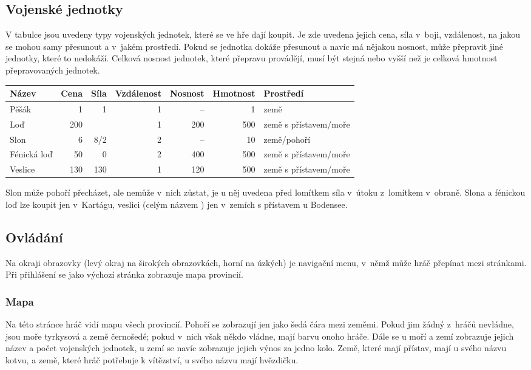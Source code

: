 \documentclass[a4paper,12pt]{article}
\begin{document}
\subsection{Vojenské jednotky}
V tabulce jsou uvedeny typy vojenských jednotek, které se ve hře dají koupit. Je zde uvedena jejich cena, síla v~boji, vzdálenost, na jakou se mohou samy přesunout a v~jakém prostředí. Pokud se jednotka dokáže přesunout a navíc má nějakou nosnost, může přepravit jiné jednotky, které to nedokáží. Celková nosnost jednotek, které přepravu provádějí, musí být stejná nebo vyšší než je celková hmotnost přepravovaných jednotek.

\begin{tabular}{l r r r r r l}
Název		& Cena	& Síla	& Vzdálenost	&Nosnost& Hmotnost	& Prostředí\\ \hline
Pěšák		& 1		& 1		& 1			& --		& 1			& země\\
Loď			& 200	& 		& 1			& 200	& 500		& země s přístavem/moře\\
Slon			& 6		& 8/2	& 2			& --		& 10			& země/pohoří\\
Fénická loď	& 50		& 0		& 2			& 400	& 500		& země s přístavem/moře\\
Veslice		& 130	& 130	& 1			& 120	& 500		& země s přístavem/moře\\
\end{tabular}

Slon může pohoří přecházet, ale nemůže v~nich zůstat, je u něj uvedena před lomítkem síla v~útoku z~lomítkem v~obraně. Slona a fénickou loď lze koupit jen v~Kartágu, veslici (celým názvem ) jen v~zemích s přístavem u Bodensee.

\subsection{Ovládání}
Na okraji obrazovky (levý okraj na širokých obrazovkách, horní na úzkých) je navigační menu, v~němž může hráč přepínat mezi stránkami. Při přihlášení se jako výchozí stránka zobrazuje mapa provincií.
\subsubsection{Mapa}
Na této stránce hráč vidí mapu všech provincií. Pohoří se zobrazují jen jako šedá čára mezi zeměmi. Pokud jim žádný z~hráčů nevládne, jsou moře tyrkysová a země černošedé; pokud v~nich však někdo vládne, mají barvu onoho hráče. Dále se u moří a zemí zobrazuje jejich název a počet vojenských jednotek, u zemí se navíc zobrazuje jejich výnos za jedno kolo. Země, které mají přístav, mají u svého názvu kotvu, a země, které hráč potřebuje k vítězství, u svého názvu mají hvězdičku.
\end{document}
